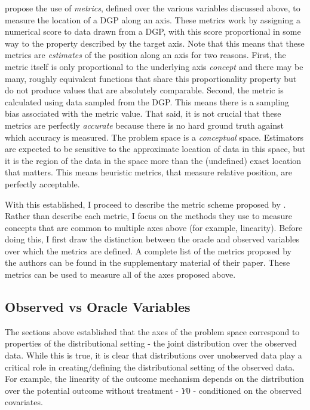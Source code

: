 \documentclass[../main.tex]{subfiles}
\begin{document}
\textcite{Dorie2019Automated1} propose the use of \textit{metrics}, defined over the various variables discussed above, to measure the location of a DGP along an axis. These metrics work by assigning a numerical score to data drawn from a DGP, with this score proportional in some way to the property described by the target axis. Note that this means that these metrics are \textit{estimates} of the position along an axis for two reasons. First, the metric itself is only proportional to the underlying axis \textit{concept} and there may be many, roughly equivalent functions that share this proportionality property but do not produce values that are absolutely comparable. Second, the metric is calculated using data sampled from the DGP. This means there is a sampling bias associated with the metric value. That said, it is not crucial that these metrics are perfectly \textit{accurate} because there is no hard ground truth against which accuracy is measured. The problem space is a \textit{conceptual} space. Estimators are expected to be sensitive to the approximate location of data in this space, but it is the region of the data in the space more than the (undefined) exact location that matters. This means heuristic metrics, that measure relative position, are perfectly acceptable.

\vspace{\baselineskip}

With this established, I proceed to describe the metric scheme proposed by \textcite{Dorie2019Automated1}. Rather than describe each metric, I focus on the methods they use to measure concepts that are common to multiple axes above (for example, linearity). Before doing this, I first draw the distinction between the oracle and observed variables over which the metrics are defined. A complete list of the metrics proposed by the authors can be found in the supplementary material of their paper. These metrics can be used to measure all of the axes proposed above.

\subsection{Observed vs Oracle Variables}

The sections above established that the axes of the problem space correspond to properties of the distributional setting - the joint distribution over the observed data. While this is true, it is clear that distributions over unobserved data play a critical role in creating/defining the distributional setting of the observed data. For example, the linearity of the outcome mechanism depends on the distribution over the potential outcome without treatment - $Y0$ - conditioned on the observed covariates.
\end{document}
